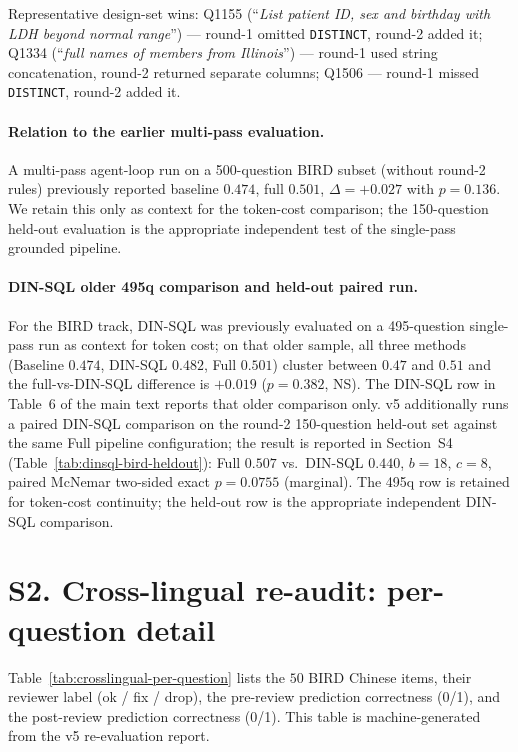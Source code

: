 \documentclass[11pt]{article}
\begin{document}
Representative design-set wins: Q1155 (``\emph{List patient ID, sex and birthday with
LDH beyond normal range}'') --- round-1 omitted \texttt{DISTINCT}, round-2 added it;
Q1334 (``\emph{full names of members from Illinois}'') --- round-1 used string
concatenation, round-2 returned separate columns; Q1506 --- round-1 missed
\texttt{DISTINCT}, round-2 added it.

\paragraph{Relation to the earlier multi-pass evaluation.} A multi-pass agent-loop
run on a 500-question BIRD subset (without round-2 rules) previously reported
baseline $0.474$, full $0.501$, $\Delta=+0.027$ with $p=0.136$. We retain this only
as context for the token-cost comparison; the 150-question held-out evaluation is
the appropriate independent test of the single-pass grounded pipeline.

\paragraph{DIN-SQL older 495q comparison and held-out paired run.} For the BIRD
track, DIN-SQL was previously evaluated on a 495-question single-pass run as
context for token cost; on that older sample, all three methods (Baseline $0.474$,
DIN-SQL $0.482$, Full $0.501$) cluster between $0.47$ and $0.51$ and the
full-vs-DIN-SQL difference is $+0.019$ ($p=0.382$, NS). The DIN-SQL row in
Table~6 of the main text reports that older comparison only. v5 additionally
runs a paired DIN-SQL comparison on the round-2 150-question held-out set against
the same Full pipeline configuration; the result is reported in Section~S4
(Table~\ref{tab:dinsql-bird-heldout}): Full $0.507$ vs.\ DIN-SQL $0.440$, $b=18$,
$c=8$, paired McNemar two-sided exact $p=0.0755$ (marginal). The 495q row is
retained for token-cost continuity; the held-out row is the appropriate independent
DIN-SQL comparison.

\section*{S2. Cross-lingual re-audit: per-question detail}

Table~\ref{tab:crosslingual-per-question} lists the $50$ BIRD Chinese items, their
reviewer label (ok / fix / drop), the pre-review prediction correctness (0/1), and
the post-review prediction correctness (0/1). This table is machine-generated from
the v5 re-evaluation report.
\end{document}
